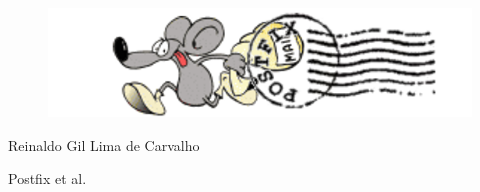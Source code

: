 \thispagestyle{empty}

\begin{center}
  \begin{figure}[H]
    \begin{center}
      \hspace{-1cm}
  \vskip 2cm
      \includegraphics[width=0.8\columnwidth]{titlepage}
    \end{center}      
  \end{figure}

  \vskip 2cm

  \hspace{-1cm}
  \begin{minipage}[c]{12cm}
    \begin{center}

{\Huge {}\vskip 0.15cm

{\large Reinaldo Gil Lima de Carvalho}
}
    \end{center}
  \end{minipage}

  \vskip 14cm

  {\Huge Postfix et al.}

\end{center}
